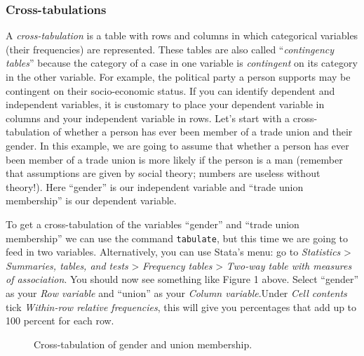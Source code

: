 \documentclass{article}
\begin{document}
\subsubsection*{Cross-tabulations}

A \textit{cross-tabulation} is a table with rows and columns in which categorical variables (their frequencies) are represented. These tables are also called ``\textit{contingency tables}'' because the category of a case in one variable is \textit{contingent} on its category in the other variable. For example, the political party a person supports may be contingent on their socio-economic status. If you can identify dependent and independent variables, it is customary to place your dependent variable in columns and your independent variable in rows. Let’s start with a cross-tabulation of whether a person has ever been member of a trade union and their gender. In this example, we are going to assume that whether a person has ever been member of a trade union is more likely if the person is a man (remember that assumptions are given by social theory; numbers are useless without theory!). Here ``gender'' is our independent variable and ``trade union membership'' is our dependent variable.

To get a cross-tabulation of the variables ``gender'' and ``trade union membership'' we can use the command \texttt{tabulate}, but this time we are going to feed in two variables. Alternatively, you can use Stata's menu: go to \textit{Statistics} > \textit{Summaries, tables, and tests} > \textit{Frequency tables} > \textit{Two-way table with measures of association}. You should now see something like Figure 1 above. Select ``gender'' as your \textit{Row variable} and ``union'' as your \textit{Column variable}.Under \textit{Cell contents} tick \textit{Within-row relative frequencies}, this will give you percentages that add up to 100 percent for each row.

\begin{figure}[H]
	\centering
	\caption{Cross-tabulation of gender and union membership.}
\end{figure}
\end{document}
